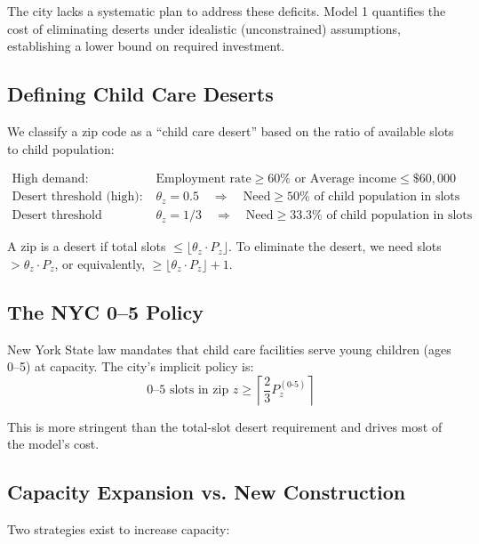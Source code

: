 \documentclass[12pt]{article}
\begin{document}
\noindent
The city lacks a systematic plan to address these deficits. Model 1 quantifies the cost of eliminating deserts 
under idealistic (unconstrained) assumptions, establishing a lower bound on required investment.

\subsection{Defining Child Care Deserts}

We classify a zip code as a ``child care desert'' based on the ratio of available slots to child population:

\begin{align}
\text{High demand:} \quad & \text{Employment rate} \geq 60\% \text{ or Average income} \leq \$60{,}000 \\
\text{Desert threshold (high):} \quad & \theta_z = 0.5 \quad \Rightarrow \quad \text{Need} \geq 50\% \text{ of child population in slots} \\
\text{Desert threshold (normal):} \quad & \theta_z = 1/3 \quad \Rightarrow \quad \text{Need} \geq 33.3\% \text{ of child population in slots}
\end{align}

\noindent
A zip is a desert if total slots $\leq \lfloor \theta_z \cdot P_z \rfloor$. To eliminate the desert, we need slots $> \theta_z \cdot P_z$, 
or equivalently, $\geq \lfloor \theta_z \cdot P_z \rfloor + 1$.

\subsection{The NYC 0--5 Policy}

New York State law mandates that child care facilities serve young children (ages 0--5) at capacity. 
The city's implicit policy is:
\begin{equation}
\text{0--5 slots in zip } z \geq \left\lceil \frac{2}{3} P_z^{(0\text{-}5)} \right\rceil
\end{equation}

This is more stringent than the total-slot desert requirement and drives most of the model's cost.

\subsection{Capacity Expansion vs. New Construction}

Two strategies exist to increase capacity:
\end{document}
